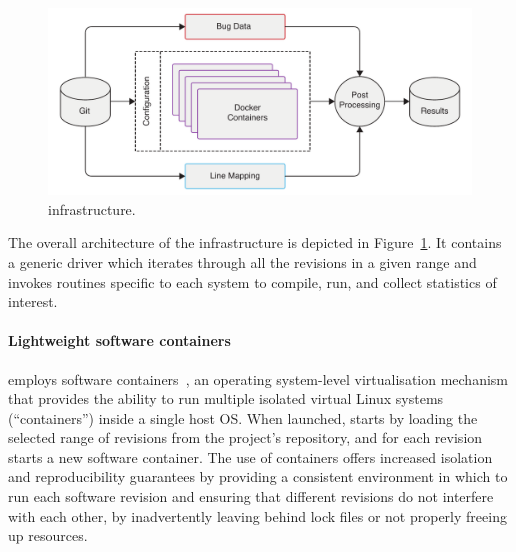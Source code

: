 \begin{figure}[t!]
\centering
\includegraphics[width=\columnwidth]{evolution/figures/pipeline}
\caption{\covrig infrastructure.}
\label{fig:arch}
\end{figure}

The overall architecture of the \covrig infrastructure is depicted
in Figure~\ref{fig:arch}.  It contains a generic driver which
iterates through all the revisions in a given range and invokes
routines specific to each system to compile, run, and collect
statistics of interest.



\paragraph{Lightweight software containers} \covrig employs software
containers~\cite{containers:eurosys07}, an operating system-level
virtualisation mechanism that provides the ability to run multiple
isolated virtual Linux systems (``containers'') inside a single host
OS.  When launched, \covrig starts by loading the selected range of
revisions from the project's \git repository, and for each revision
starts a new software container.  The use of containers offers
increased isolation and reproducibility guarantees by providing a
consistent environment in which to run each software revision and
ensuring that different revisions do not interfere with each other,
\eg by inadvertently leaving behind lock files or not properly freeing
up resources.

